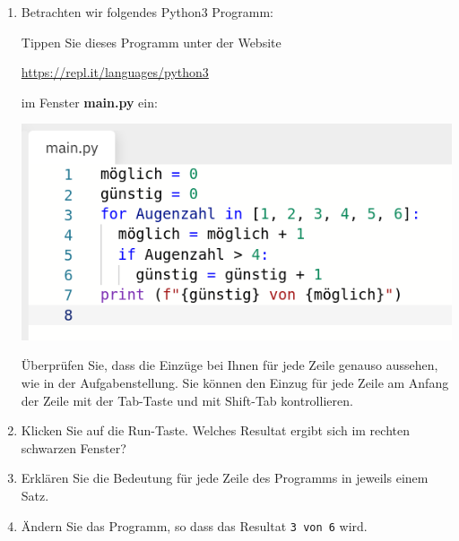 \documentclass{article}
\begin{document}
\begin{enumerate}
\item Betrachten wir folgendes Python3 Programm:

Tippen Sie dieses Programm unter der Website
\begin{center}\url{https://repl.it/languages/python3}\end{center}
im Fenster \textbf{main.py} ein:
\begin{center}\includegraphics[scale=0.5]{main-py-window}\end{center}
Überprüfen Sie, dass die Einzüge bei Ihnen für jede Zeile genauso aussehen, wie in der Aufgabenstellung.
Sie können den Einzug für jede Zeile am Anfang der Zeile mit der Tab-Taste und mit Shift-Tab kontrollieren.

\item Klicken Sie auf die Run-Taste. Welches Resultat ergibt sich im rechten schwarzen Fenster?

\item Erklären Sie die Bedeutung für jede Zeile des Programms in jeweils einem Satz.

\item Ändern Sie das Programm, so dass das Resultat \texttt{3 von 6} wird.
\end{enumerate}
\end{document}
